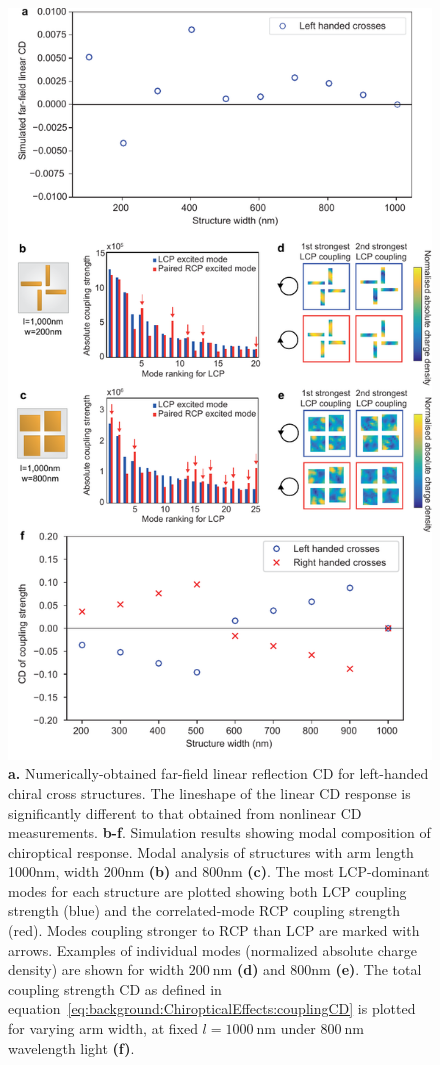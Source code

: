 \begin{figure}[htb!]	
    \centering	
    \includegraphics[scale=0.8]{./figures/results/EnantiomorphingChiralCrosses/l1000modes.pdf}
    \caption{\label{fig:results:EnantiomorphingChiralCrosses:l1000modes}
    \textbf{a.} Numerically-obtained far-field linear reflection CD for left-handed chiral cross structures. The lineshape of the linear CD response is significantly different to that obtained from nonlinear CD measurements. \textbf{b-f}. Simulation results showing modal composition of chiroptical response. Modal analysis of structures with arm length 1000nm, width 200nm \textbf{(b)} and 800nm \textbf{(c)}. The most LCP-dominant modes for each structure are plotted showing both LCP coupling strength (blue) and the correlated-mode RCP coupling strength (red). Modes coupling stronger to RCP than LCP are marked with arrows. Examples of individual modes (normalized absolute charge density) are shown for width $\SI{200}{\nano\m}$ \textbf{(d)} and 800nm \textbf{(e)}. The total coupling strength CD as defined in equation~\ref{eq:background:ChiropticalEffects:couplingCD} is plotted for varying arm width, at fixed $l=\SI{1000}{\nano\m}$ under $\SI{800}{\nano\m}$ wavelength light \textbf{(f)}.}	

\end{figure}
